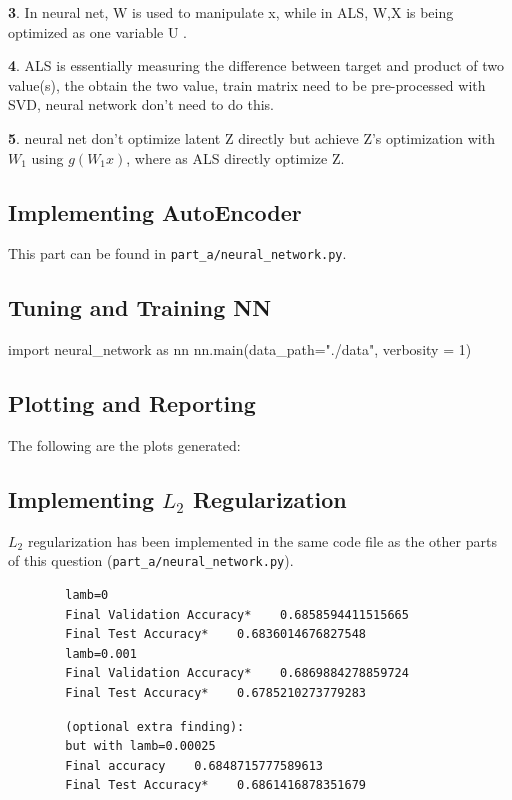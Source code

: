 \documentclass{article}
\begin{document}
    \textbf{3}. In neural net, W is used to manipulate x, while in ALS, W,X is being optimized as one variable U .

    \textbf{4}. ALS is essentially measuring the difference between target and product of two value(s), the obtain the two value, train matrix need to be pre-processed with SVD, neural network don't need to do this.

    \textbf{5}. neural net don't optimize latent Z directly but achieve Z's optimization with $W_1$ using $g(W_1 x)$, where as ALS directly optimize Z.


    \subsection{Implementing AutoEncoder}
    This part can be found in \verb|part_a/neural_network.py|.

    \subsection{Tuning and Training NN}
    \begin{pylabblock}[NN]
        import neural_network as nn
        nn.main(data_path="./data", verbosity = 1)
    \end{pylabblock}
    \printpythontex[verb]

    \subsection{Plotting and Reporting}
    The following are the plots generated:

    \subsection{Implementing $L_2$ Regularization}
    $L_2$ regularization has been implemented in the same code file as the other parts of this question (\verb|part_a/neural_network.py|).

    \begin{verbatim}
        lamb=0
        Final Validation Accuracy*    0.6858594411515665
        Final Test Accuracy*    0.6836014676827548
        lamb=0.001
        Final Validation Accuracy*    0.6869884278859724
        Final Test Accuracy*    0.6785210273779283
    \end{verbatim}

    \begin{verbatim}
        (optional extra finding):
        but with lamb=0.00025
        Final accuracy    0.6848715777589613
        Final Test Accuracy*    0.6861416878351679
    \end{verbatim}
\end{document}
